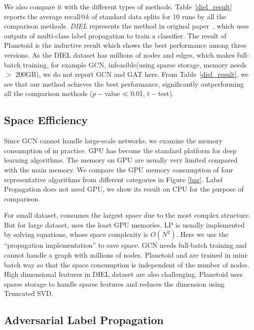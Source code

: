 We also compare it with the different types of methods. 
Table~\ref{diel_result}
reports the average recall@$k$ of standard data splits for 10 runs by all the comparison methods.
{\it DIEL} 
represents the method in original paper~\cite{bing2015improving}, which uses outputs of multi-class label propagation to train a classifier. 
The result of Planetoid is the inductive result which shows the best performance among three versions. As the DIEL dataset has millions of nodes and edges, which makes full-batch training, for example GCN, infeasible(using sparse storage, memory needs 
$>$ 200GB),  we do not report GCN and GAT here. From Table~\ref{diel_result}, we see that our method \smodel achieves the best performance, significantly outperforming all the comparison methods ($p-$value$\ll$0.01, $t-$test).






\subsection{Space Efficiency}


Since GCN cannot handle large-scale networks, we examine the memory consumption of \smodel in practice. GPU has become the standard platform for deep learning algorithms. The memory on GPU are usually very limited compared with the main memory. We compare the GPU memory consumption of four representative algorithms from different categories in Figure \ref{bar}. Label Propagation does not need GPU, we show its result on CPU for the purpose of comparison. 

For small dataset, \smodel consumes the largest space due to the most complex structure. But for large dataset, \smodel uses the least GPU memories. LP is usually implemented by solving equations, whose space complexity is $O(N^2)$. Here we use the ``propagation implementation'' to save space. GCN needs full-batch training and cannot handle a graph with millions of nodes. Planetoid and \smodel are trained in mini-batch way so that the space consumption is independent of the number of nodes. High dimensional features in DIEL dataset are also challenging. Planetoid uses sparse storage to handle sparse features and \smodel reduces the dimension using Truncated SVD.  



\subsection{Adversarial Label Propagation}
 \label{subsec:morediscussions}

